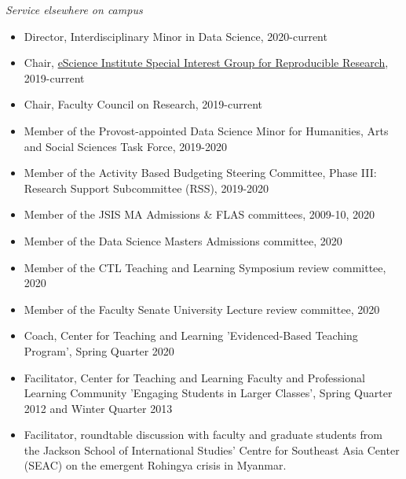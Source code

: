  \medskip
 
 \newpage

\noindent\emph{Service elsewhere on campus\vspace{0.01in}}

\medskip

\begin{itemize}[noitemsep, font=$\bullet$\scshape\bfseries]

\item  Director, Interdisciplinary Minor in Data Science, 2020-current

\item Chair, \href{http://uwescience.github.io/reproducible/}{eScience Institute Special Interest Group for Reproducible Research}, 2019-current

\item  Chair, Faculty Council on Research, 2019-current

\item  Member of the Provost-appointed Data Science Minor for Humanities, Arts and Social Sciences Task Force, 2019-2020

\item  Member of the Activity Based Budgeting Steering Committee, Phase III:  Research Support Subcommittee (RSS), 2019-2020

\item  Member of the JSIS MA Admissions \& FLAS committees, 2009-10, 2020

\item  Member of the Data Science Masters Admissions committee, 2020

\item  Member of the CTL Teaching and Learning Symposium review committee, 2020

\item  Member of the Faculty Senate University Lecture review committee, 2020

\item  Coach, Center for Teaching and Learning 'Evidenced-Based Teaching Program', Spring Quarter 2020

\item  Facilitator, Center for Teaching and Learning Faculty and Professional Learning Community 'Engaging Students in Larger Classes', Spring Quarter 2012 and Winter Quarter 2013

\item  Facilitator, roundtable discussion with faculty and graduate students from the Jackson School of International Studies’ Centre for Southeast Asia Center (SEAC) on the emergent Rohingya crisis in Myanmar. 


\end{itemize}
